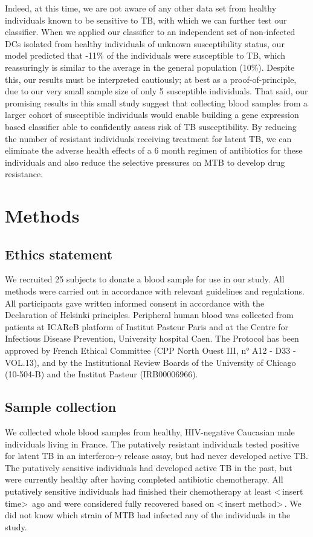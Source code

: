 \documentclass[fleqn,10pt]{wlscirep}
\begin{document}
Indeed, at this time, we are not aware of any other data set from
healthy individuals known to be sensitive to TB, with which we can
further test our classifier. When we applied our classifier to an
independent set of non-infected DCs isolated from healthy individuals
of unknown susceptibility status, our model predicted that
-11\% of the individuals were susceptible to TB, which
reassuringly is similar to the average in the general population
(10\%). Despite this, our results must be interpreted cautiously; at
best as a proof-of-principle, due to our very small sample size of
only 5 susceptible individuals. That said, our promising results in
this small study suggest that collecting blood samples from a larger
cohort of susceptible individuals would enable building a gene
expression based classifier able to confidently assess risk of TB
susceptibility. By reducing the number of resistant individuals
receiving treatment for latent TB, we can eliminate the adverse health
effects of a 6 month regimen of antibiotics for these individuals and
also reduce the selective pressures on MTB to develop drug resistance.
\section*{Methods}

\subsection*{Ethics statement}

We recruited 25 subjects to donate a blood sample for use in our
study. All methods were carried out in accordance with relevant
guidelines and regulations. All participants gave written informed
consent in accordance with the Declaration of Helsinki principles.
Peripheral human blood was collected from patients at ICAReB platform
of Institut Pasteur Paris and at the Centre for Infectious Disease
Prevention, University hospital Caen. The Protocol has been approved
by French Ethical Committee (CPP North Ouest III, n° A12 - D33
-VOL.13), and by the Institutional Review Boards of the University of
Chicago (10-504-B) and the Institut Pasteur (IRB00006966).
\subsection*{Sample collection}

We collected whole blood samples from healthy, HIV-negative Caucasian
male individuals living in France. The putatively resistant
individuals tested positive for latent TB in an interferon-$\gamma$
release assay, but had never developed active TB. The putatively
sensitive individuals had developed active TB in the past, but were
currently healthy after having completed antibiotic chemotherapy. All
putatively sensitive individuals had finished their chemotherapy at
least \textless \,insert time\textgreater \, ago and were considered
fully recovered based on \textless \,insert method\textgreater \,. We
did not know which strain of MTB had infected any of the individuals
in the study.
\end{document}
